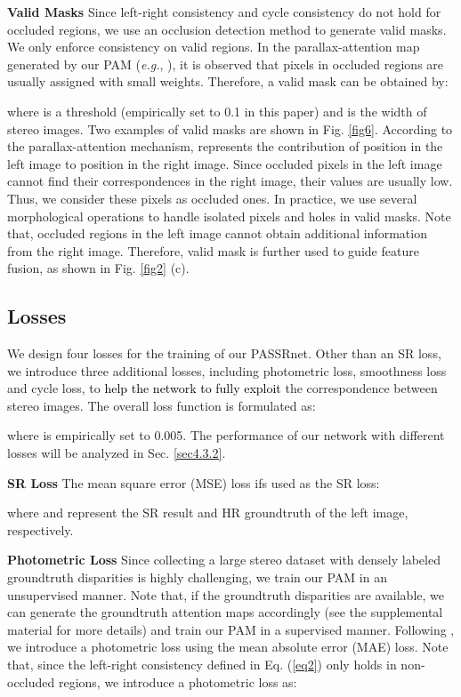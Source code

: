 \documentclass[10pt,twocolumn,letterpaper]{article}
\begin{document}
\noindent
\textbf{Valid Masks}
Since left-right consistency and cycle consistency do not hold for occluded regions, we use an occlusion detection method to generate valid masks. We only enforce consistency on valid regions. In the parallax-attention map generated by our PAM (\emph{e.g.}, ), it is observed that pixels in occluded regions are usually assigned with small weights. Therefore, a valid mask  can be obtained by:

where  is a threshold (empirically set to 0.1 in this paper) and  is the width of stereo images. Two examples of valid masks are shown in Fig. \ref{fig6}. According to the parallax-attention mechanism,  represents the contribution of position  in the left image to position  in the right image. Since occluded pixels in the left image cannot find their correspondences in the right image, their values  are usually low. Thus, we consider these pixels as occluded ones. In practice, we use several morphological operations to handle isolated pixels and holes in valid masks. Note that, occluded regions in the left image cannot obtain additional information from the right image. Therefore, valid mask  is further used to guide feature fusion, as shown in Fig. \ref{fig2} (c).

\subsection{Losses}
\label{sec3.3}
We design four losses for the training of our PASSRnet. Other than an SR loss, we introduce three additional losses, including photometric loss, smoothness loss and cycle loss, to \textcolor{black}{help the network to fully exploit} the correspondence between stereo images. The overall loss function is formulated as:

where  is empirically set to 0.005. The performance of our network with different losses will be analyzed in Sec. \ref{sec4.3.2}.

\noindent
\textbf{SR Loss}
The mean square error (MSE) loss ifs used as the SR loss:

where  and  represent the SR result and HR groundtruth of the left image, respectively.

\noindent
\textbf{Photometric Loss}
Since collecting a large stereo dataset with densely labeled groundtruth disparities is highly challenging, we train our PAM in an unsupervised manner. Note that, if the groundtruth disparities are available, we can generate the groundtruth attention maps accordingly (see the supplemental material for more details) and train our PAM in a supervised manner. Following \cite{2017-UnsupervisedMonocularDepthEstimationwithLeftRightConsistency-Godard-6602-6611}, we introduce a photometric loss using the mean absolute error (MAE) loss. Note that, since the left-right consistency defined in Eq. (\ref{eq2}) only holds in non-occluded regions, we introduce a photometric loss as:
\end{document}
